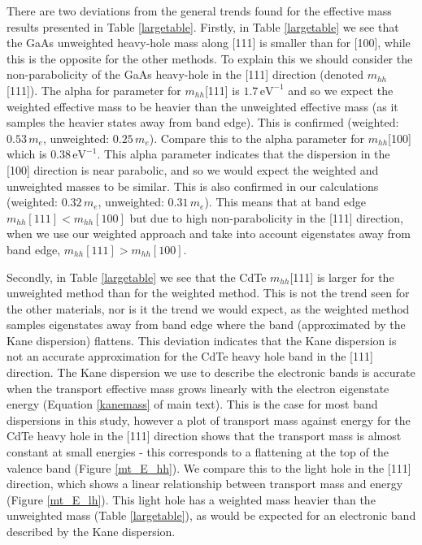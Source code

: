 There are two deviations from the general trends found for the effective mass results presented in Table \ref{largetable}. 
Firstly, in Table \ref{largetable} we see that the GaAs unweighted heavy-hole mass along [111] is smaller than for [100], while this is the opposite for the other methods. To explain this we should consider the non-parabolicity of the GaAs heavy-hole in the [111] direction (denoted $m_{hh}$[111]). The alpha for parameter for $m_{hh}$[111] is $1.7\,\mathrm{eV}^{-1}$ and so we expect the weighted effective mass to be heavier than the unweighted effective mass (as it samples the heavier states away from band edge). This is confirmed (weighted: $0.53\,m_e$, unweighted: $0.25\,m_e$). Compare this to the alpha parameter for $m_{hh}$[100] which is $0.38\,\mathrm{eV}^{-1}$. This alpha parameter indicates that the dispersion in the [100] direction is near parabolic, and so we would expect the weighted and unweighted masses to be similar. This is also confirmed in our calculations (weighted: $0.32\,m_e$, unweighted: $0.31\,m_e$).
This means that at band edge $m_{hh}\mathrm{[111]} < m_{hh}\mathrm{[100]}$ but due to high non-parabolicity in the [111] direction, when we use our weighted approach and take into account eigenstates away from band edge, $m_{hh}\mathrm{[111]} > m_{hh}\mathrm{[100]}$.

Secondly, in Table \ref{largetable} we see that the CdTe $m_{hh}$[111] is larger for the unweighted method than for the weighted method. This is not the trend seen for the other materials, nor is it the trend we would expect, as the weighted method samples eigenstates away from band edge where the band (approximated by the Kane dispersion) flattens.
This deviation indicates that the Kane dispersion is not an accurate approximation for the CdTe heavy hole band in the [111] direction. The Kane dispersion we use to describe the electronic bands is accurate when the transport effective mass grows linearly with the electron eigenstate energy (Equation \ref{kanemass} of main text). This is the case for most band dispersions in this study, however a plot of transport mass against energy for the CdTe heavy hole in the [111] direction shows that the transport mass is almost constant at small energies - this corresponds to a flattening at the top of the valence band (Figure \ref{mt_E_hh}). We compare this to the light hole in the [111] direction, which shows a linear relationship between transport mass and energy (Figure \ref{mt_E_lh}). This light hole has a weighted mass heavier than the unweighted mass (Table \ref{largetable}), as would be expected for an electronic band described by the Kane dispersion.

